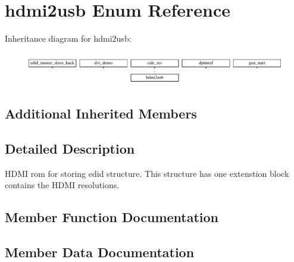 \section{hdmi2usb Enum Reference}
\label{enum1hdmi2usb}
Inheritance diagram for hdmi2usb\-:\begin{figure}[H]
\begin{center}
\leavevmode
\includegraphics[height=1.408805cm]{enum1hdmi2usb}
\end{center}
\end{figure}
\subsection*{Additional Inherited Members}


\subsection{Detailed Description}
H\-D\-M\-I rom for storing edid structure. This structure has one extenstion block contains the H\-D\-M\-I resolutions. 

\subsection{Member Function Documentation}
\subsubsection[{P\-R\-O\-C\-E\-S\-S\-\_\-17}]{\setlength{\rightskip}{0pt plus 5cm}\hspace{0.3cm}}\label{enum1hdmirom_a5427232bb22991550e6168cf5171fc30}


\subsection{Member Data Documentation}
\subsubsection[{clk}]{ {\bfseries \textcolor{vhdlchar}{ }} \hspace{0.3cm}}\label{enum1hdmirom_aa6ff7e2546798dadf1b44198a05df727}
